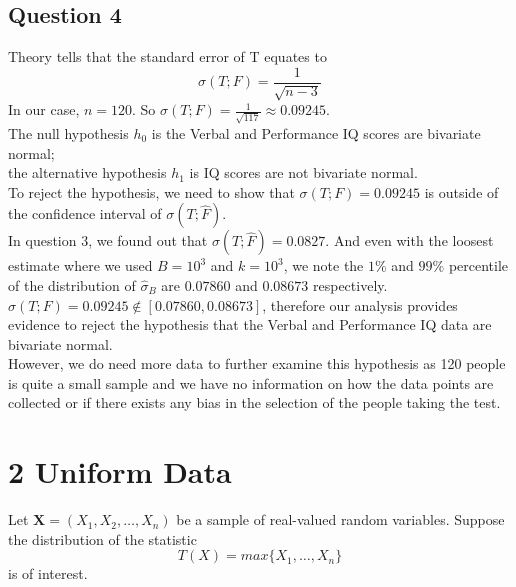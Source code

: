 \documentclass[10pt]{article}
\begin{document}
\subsection*{Question 4}
Theory tells that the standard error of T equates to
\[\sigma(T;F)=\frac{1}{\sqrt{n-3}}\]
In our case, $n=120$. So $\sigma(T;F)=\frac{1}{\sqrt{117}}\approx0.09245$.\\
The null hypothesis $h_0$ is the Verbal and Performance IQ scores are bivariate normal;\\
the alternative hypothesis $h_1$ is IQ scores are not bivariate normal.\\
To reject the hypothesis, we need to show that $\sigma(T;F)=0.09245$ is outside of the confidence interval of $\sigma(T;\hat{F})$.\\
In question 3, we found out that $\sigma(T;\hat{F})=0.0827$. And even with the loosest estimate where we used $B=10^3$ and $k=10^3$, we note the $1\%$ and $99\%$ percentile of the distribution of $\hat{\sigma}_B$ are $0.07860$ and $0.08673$ respectively.\\
$\sigma(T;F)=0.09245\notin[0.07860,0.08673]$, therefore our analysis provides evidence to reject the hypothesis that the Verbal and Performance IQ data are bivariate normal.\\
However, we do need more data to further examine this hypothesis as 120 people is quite a small sample and we have no information on how the data points are collected or if there exists any bias in the selection of the people taking the test.\\

\section*{2 Uniform Data}
Let $\mathbf{X}=(X_1,X_2,\dots,X_n)$ be a sample of real-valued random variables. Suppose the distribution of the statistic \[T(X)=max\{X_1,\dots,X_n\}\] is of interest.
\end{document}

